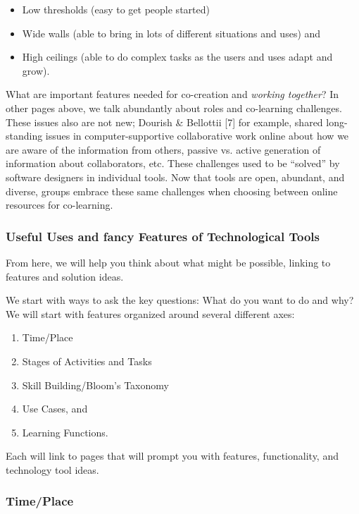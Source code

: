 \begin{itemize}
\itemsep1pt\parskip0pt
\item
  Low thresholds (easy to get people started)
\item
  Wide walls (able to bring in lots of different situations and uses)
  and
\item
  High ceilings (able to do complex tasks as the users and uses adapt
  and grow).
\end{itemize}

What are important features needed for co-creation and \emph{working
together}? In other pages above, we talk abundantly about roles and
co-learning challenges. These issues also are not new; Dourish \&
Bellottii {[}7{]} for example, shared long-standing issues in
computer-supportive collaborative work online about how we are aware of
the information from others, passive vs. active generation of
information about collaborators, etc. These challenges used to be
``solved'' by software designers in individual tools. Now that tools are
open, abundant, and diverse, groups embrace these same challenges when
choosing between online resources for co-learning.

\subsubsection{Useful Uses and fancy Features of Technological Tools}

From here, we will help you think about what might be possible, linking
to features and solution ideas.

We start with ways to ask the key questions: What do you want to do and
why? We will start with features organized around several different
axes:

\begin{enumerate}
\itemsep1pt\parskip0pt
\item
  Time/Place
\item
  Stages of Activities and Tasks
\item
  Skill Building/Bloom's Taxonomy
\item
  Use Cases, and
\item
  Learning Functions.
\end{enumerate}

Each will link to pages that will prompt you with features,
functionality, and technology tool ideas.

\subsubsection{Time/Place}

